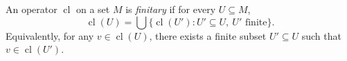 An operator $\operatorname{cl}$ on a set $M$ is \emph{finitary} if for every $U \subseteq M$,
$$\operatorname{cl}(U) = \bigcup \{ \operatorname{cl}(U') : U' \subseteq U,\ U' \text{ finite} \}.$$
Equivalently, for any $v \in \operatorname{cl}(U)$, there exists a finite subset $U' \subseteq U$ such that $v \in \operatorname{cl}(U')$.
